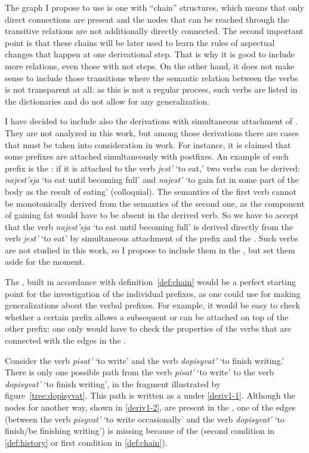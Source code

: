 The graph I propose to use is one with ``chain'' structures, which means that only direct connections are present and the nodes that can be reached through the transitive relations are not additionally directly connected. The second important point is that these chains will be later used to learn the rules of aspectual changes that happen at one derivational step. That is why it is good to include more relations, even those with not  steps. On the other hand, it does not make sense to include those transitions where the semantic relation between the verbs is not transparent at all: as this is not a regular process, such verbs are listed in the dictionaries and do not allow for any generalization. 

I have decided to include also the derivations with simultaneous attachment of . They are not analyzed in this work, but among those derivations there are cases that must be taken into consideration in  work. For instance, it is claimed that some prefixes are attached simultaneously with postfixes. An example of such prefix is the  : if it is attached to the verb \textit{jest'} `to eat,' two verbs can be derived: \textit{najest'sja} `to eat until becoming full' and \textit{najest'} `to gain fat in some part of the body as the result of eating' (colloquial). The semantics of the first verb cannot be  monotonically derived from the semantics of the second one, as the component of gaining fat would have to be absent in the derived verb. So we have to accept that the verb \textit{najest'sja} `to eat until becoming full' is derived directly from the verb \textit{jest'} `to eat' by simultaneous attachment of the prefix and the . Such verbs are not studied in this work, so I propose to include them in the , but set them aside for the moment.
 
The , built in accordance with definition~\ref{def:chain} would be a perfect starting point for the investigation of the individual prefixes, as one could use  for making generalizations about the verbal prefixes. For example, it would be easy to check whether a certain prefix allows a subsequent  or can be attached on top of the other prefix: one only would have to check the properties of the verbs that are connected with the edges in the . 

Consider the verb {\it pisat'} `to write' and the verb {\it dopisyvat'} `to finish writing.' There is only one possible path from the verb {\it pisat'} `to write' to the verb {\it dopisyvat'} `to finish writing', in the  fragment illustrated by figure~\ref{tree:dopisyvat}. This path is written as a  under \ref{deriv1-1}. Although the nodes for another way, shown in \ref{deriv1-2}, are present in the , one of the edges (between the verb \textit{pisyvat'} `to write occasionally' and the verb \textit{dopisyvat'} `to finish/be finishing writing') is missing because of the  (second condition in \ref{def:history} or first condition in \ref{def:chain}).

